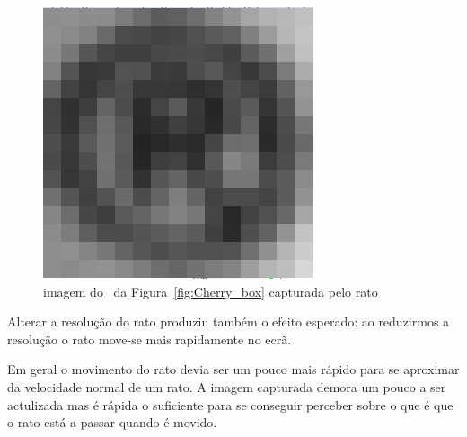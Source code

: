 \documentclass[a4paper]{article}
\begin{document}
\begin{figure}[t]
\centering
\includegraphics{rprintscreen}
\caption{imagem do \textregistered\ da Figura~\ref{fig:Cherry_box} capturada pelo rato}
\label{fig:registed_capture}
\end{figure}

Alterar a resolução do rato produziu também o efeito esperado: ao reduzirmos a resolução o rato move-se mais rapidamente no ecrã.

Em geral o movimento do rato devia ser um pouco mais rápido para se aproximar da velocidade normal de um rato. A imagem capturada demora um pouco a ser actulizada mas é rápida o suficiente para se conseguir perceber sobre o que é que o rato está a passar quando é movido.
\end{document}
